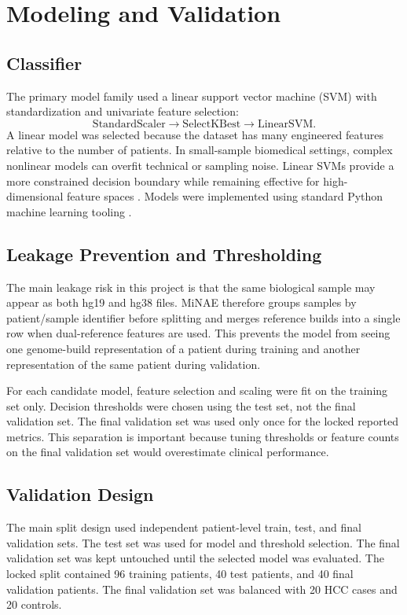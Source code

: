 \documentclass[conference]{IEEEtran}
\begin{document}
\section{Modeling and Validation}
\subsection{Classifier}
The primary model family used a linear support vector machine (SVM) with standardization and univariate feature selection:
\begin{equation}
    \mathrm{StandardScaler} \rightarrow \mathrm{SelectKBest} \rightarrow \mathrm{LinearSVM}.
\end{equation}
A linear model was selected because the dataset has many engineered features relative to the number of patients. In small-sample biomedical settings, complex nonlinear models can overfit technical or sampling noise. Linear SVMs provide a more constrained decision boundary while remaining effective for high-dimensional feature spaces \cite{cortes1995support}. Models were implemented using standard Python machine learning tooling \cite{pedregosa2011scikit}.

\subsection{Leakage Prevention and Thresholding}
The main leakage risk in this project is that the same biological sample may appear as both hg19 and hg38 files. MiNAE therefore groups samples by patient/sample identifier before splitting and merges reference builds into a single row when dual-reference features are used. This prevents the model from seeing one genome-build representation of a patient during training and another representation of the same patient during validation.

For each candidate model, feature selection and scaling were fit on the training set only. Decision thresholds were chosen using the test set, not the final validation set. The final validation set was used only once for the locked reported metrics. This separation is important because tuning thresholds or feature counts on the final validation set would overestimate clinical performance.

\subsection{Validation Design}
The main split design used independent patient-level train, test, and final validation sets. The test set was used for model and threshold selection. The final validation set was kept untouched until the selected model was evaluated. The locked split contained 96 training patients, 40 test patients, and 40 final validation patients. The final validation set was balanced with 20 HCC cases and 20 controls.
\end{document}
